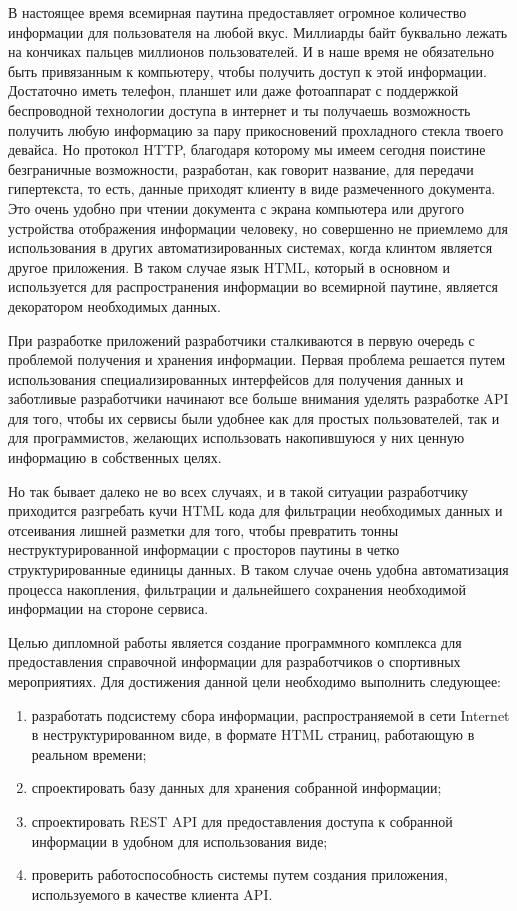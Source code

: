 \Introduction

В настоящее время всемирная паутина предоставляет огромное количество информации для пользователя на любой вкус. Миллиарды байт буквально лежать на кончиках пальцев миллионов пользователей. И в наше время не обязательно быть привязанным к компьютеру, чтобы получить доступ к этой информации. Достаточно иметь телефон, планшет или даже фотоаппарат с поддержкой беспроводной технологии доступа в интернет и ты получаешь возможность получить любую информацию за пару прикосновений прохладного стекла твоего девайса. Но протокол HTTP, благодаря которому мы имеем сегодня поистине безграничные возможности, разработан, как говорит название, для передачи гипертекста, то есть, данные приходят клиенту в виде размеченного документа. Это очень удобно при чтении документа с экрана компьютера или другого устройства отображения информации человеку, но совершенно не приемлемо для использования в других автоматизированных системах, когда клинтом является другое приложения. В таком случае язык HTML, который в основном и используется для распространения информации во всемирной паутине, является декоратором необходимых данных. 

При разработке приложений разработчики сталкиваются в первую очередь с проблемой получения и хранения информации. Первая проблема решается путем использования специализированных интерфейсов для получения данных и заботливые разработчики начинают все больше внимания уделять разработке API для того, чтобы их сервисы были удобнее как для простых пользователей, так и для программистов, желающих использовать накопившуюся у них ценную информацию в собственных целях.

Но так бывает далеко не во всех случаях, и в такой ситуации разработчику приходится разгребать кучи HTML кода для фильтрации необходимых данных и отсеивания лишней разметки для того, чтобы превратить тонны неструктурированной информации с просторов паутины в четко структурированные единицы данных. В таком случае очень удобна автоматизация процесса накопления, фильтрации и дальнейшего сохранения необходимой информации на стороне сервиса. 

Целью дипломной работы является создание программного комплекса для предоставления справочной информации для разработчиков о спортивных мероприятиях. Для достижения данной цели необходимо выполнить следующее: 

\begin{enumerate}
\item разработать подсистему сбора информации, распространяемой в сети Internet в неструктурированном виде, в формате HTML страниц, работающую в реальном времени;
\item спроектировать базу данных для хранения собранной информации;
\item спроектировать REST API для предоставления доступа к собранной информации в удобном для использования виде;
\item проверить работоспособность системы путем создания приложения, используемого в качестве клиента API.
\end{enumerate}

